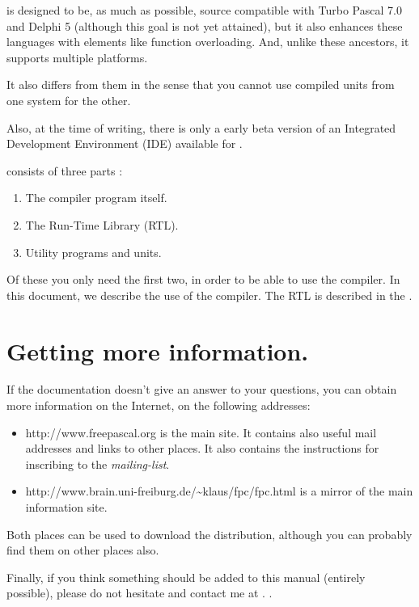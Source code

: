 \documentclass{report}
\begin{document}
\fpc is designed to be, as much as possible, source compatible with
Turbo Pascal 7.0 and Delphi 5 (although this goal is not yet attained),
but it also enhances these languages with elements like function overloading.
And, unlike these ancestors, it supports multiple platforms.

It also differs from them in the sense that you cannot use compiled units
from one system for the other.

Also, at the time of writing, there is only a early beta version of an
Integrated Development Environment (IDE) available for \fpc.

\fpc consists of three parts :
\begin{enumerate}
\item The compiler program itself.
\item The Run-Time Library (RTL).
\item Utility programs and units.
\end{enumerate}

Of these you only need the first two, in order to be able to use the compiler.
In this document, we describe the use of the compiler. The RTL is described in the
.

\section{Getting more information.}
If the documentation doesn't give an answer to your questions,
you can obtain more information on the Internet, on the following addresses:
\begin{itemize}
\item
{}
{http://www.freepascal.org} is the main
site. It contains also useful mail addresses and
links to other places.
It also contains the instructions for inscribing to the
\textit{mailing-list}.

\item
{}
{http://www.brain.uni-freiburg.de/\~{}klaus/fpc/fpc.html} is a mirror
of the main \fpc information site.
\end{itemize}
Both places can be used to download the \fpc distribution, although you can
probably find them on other places also.

Finally, if you think something should be added to this manual
(entirely possible), please do not hesitate and contact me at
.
.
\end{document}
